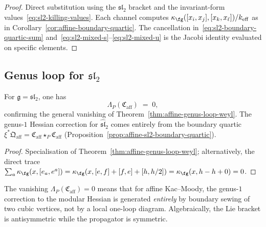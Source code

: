 \begin{proof}
Direct substitution using the $\mathfrak{sl}_2$ bracket and
the invariant-form values~\eqref{eq:sl2-killing-values}. Each channel
computes $\kappa_{\fg}([x_i,x_j],[x_k,x_\ell])/k_{\mathrm{eff}}$
as in Corollary~\ref{cor:affine-boundary-quartic}. The
cancellation in~\eqref{eq:sl2-boundary-quartic-sum}
and~\eqref{eq:sl2-mixed-s}--\eqref{eq:sl2-mixed-u} is the
Jacobi identity evaluated on specific elements.
\end{proof}

\subsection{Genus loop for \texorpdfstring{$\mathfrak{sl}_2$}{sl(2)}}
\label{subsec:affine-sl2-genus-loop}

\begin{proposition}\label{prop:affine-sl2-genus-loop}
For $\mathfrak{g} = \mathfrak{sl}_2$, one has
\begin{equation}\label{eq:sl2-genus-loop-formula}
\Lambda_P(\mathfrak{C}_{\mathrm{aff}}) \;=\; 0,
\end{equation}
confirming the general vanishing of
Theorem~\textup{\ref{thm:affine-genus-loop-weyl}}. The
genus-$1$ Hessian correction for $\widehat{\mathfrak{sl}}_2$
comes entirely from the boundary quartic
$\xi^*\mathfrak{Q}_{\mathrm{aff}}
= \mathfrak{C}_{\mathrm{aff}} \star_P
\mathfrak{C}_{\mathrm{aff}}$
\textup{(}Proposition~\textup{\ref{prop:affine-sl2-boundary-quartic})}.
\end{proposition}

\begin{proof}
Specialisation of
Theorem~\ref{thm:affine-genus-loop-weyl}; alternatively,
the direct trace
$\sum_a \kappa_{\fg}(x,[e_a,e^a])
= \kappa_{\fg}(x,[e,f]+[f,e]+[h,h/2])
= \kappa_{\fg}(x,h-h+0) = 0$.\qedhere
\end{proof}

\begin{remark}
\label{rem:sl2-genus-loop-sugawara}
The vanishing $\Lambda_P(\mathfrak{C}_{\mathrm{aff}}) = 0$
means that for affine Kac--Moody, the genus-$1$ correction to
the modular Hessian is generated \emph{entirely} by boundary
sewing of two cubic vertices, not by a local one-loop diagram.
Algebraically, the Lie
bracket is antisymmetric while the propagator is symmetric.
\end{remark}

